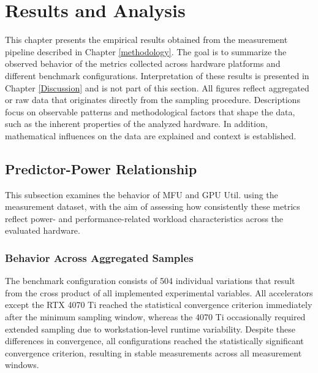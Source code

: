 \documentclass[runningheads]{llncs}
\begin{document}

\section{Results and Analysis}\label{results}
This chapter presents the empirical results obtained from the measurement pipeline described in Chapter \ref{methodology}. The goal is to summarize the observed behavior of the metrics collected across hardware platforms and different benchmark configurations. Interpretation of these results is presented in Chapter \ref{Discussion} and is not part of this section. All figures reflect aggregated or raw data that originates directly from the sampling procedure. Descriptions focus on observable patterns and methodological factors that shape the data, such as the inherent properties of the analyzed hardware. In addition, mathematical influences on the data are explained and context is established.

\subsection{Predictor-Power Relationship}\label{Predictor Performance}
This subsection examines the behavior of MFU and GPU Util. using the measurement dataset, with the aim of assessing how consistently these metrics reflect power- and performance-related workload characteristics across the evaluated hardware.\\

\subsubsection{Behavior Across Aggregated Samples}
The benchmark configuration consists of 504 individual variations that result from the cross product of all implemented experimental variables.
All accelerators except the RTX 4070 Ti reached the statistical convergence criterion immediately after the minimum sampling window, whereas the 4070 Ti occasionally required extended sampling due to workstation-level runtime variability. Despite these differences in convergence, all configurations reached the statistically significant convergence criterion, resulting in stable measurements across all measurement windows.\\
\end{document}
